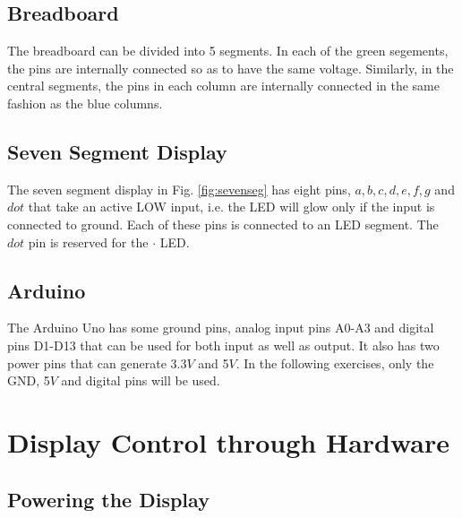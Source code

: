 \documentclass[journal,12pt,twocolumn]{IEEEtran}
\begin{document}
	\subsection{Breadboard}
	The breadboard can be divided into 5 segments.  In each of the green segements, the pins are internally connected so as to have the same voltage.  Similarly, in the central segments, the pins in each column  are internally connected in the same fashion as the blue columns. 
	\subsection{Seven Segment Display}
	The seven segment display in Fig. \ref{fig:sevenseg} has eight pins, $a, b, c, d, e, f, g$ and $dot$ that take an active LOW input, i.e.  the LED will glow only if the input is connected to ground.  Each of these pins is connected to an LED segment.  The $dot$ pin is  reserved for the $\cdot$ LED.  
	
	\subsection{Arduino}
	The Arduino Uno has some ground pins, analog input pins A0-A3 and digital pins D1-D13 that can be used for both input as well as output. It also has two power pins that can generate 3.3$V$ and 5$V$.  In the following exercises, only the GND, 5$V$ and digital pins will be used.
	
	
	\section{Display Control through Hardware }
	\subsection{Powering the Display}
	
\end{document}
